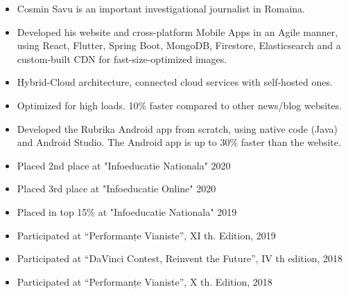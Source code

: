 \documentclass[10pt,a4paper,ragged2e]{resume}
\begin{document}

    \begin{fullwidth}
        \makecvheader
    \end{fullwidth}





    \begin{itemize}
        \item Cosmin Savu is an important investigational journalist in Romaina.
        \item Developed his website and cross-platform Mobile Apps in an Agile manner, using React, Flutter, Spring Boot, MongoDB, Firestore, Elasticsearch and a custom-built CDN for fast-size-optimized images.
        \item Hybrid-Cloud architecture, connected cloud services with self-hosted ones.
        \item Optimized for high loads. 10\% faster compared to other news/blog websites.
    \end{itemize}

    \divider

    \begin{itemize}
        \item Developed the Rubrika Android app from scratch, using native code (Java) and Android Studio. The Android app is up to 30\% faster than the website.
        \smallskip
    \end{itemize}

    \smallskip
    \begin{itemize}
        \item Placed 2nd place at "Infoeducatie Nationala" 2020
        \item Placed 3rd place at "Infoeducatie Online" 2020
        \item Placed in top 15\% at "Infoeducatie Nationala" 2019
        \item Participated at \textquotedblleft Performanțe Vianiste\textquotedblright, XI th. Edition, 2019
        \item Participated at \textquotedblleft DaVinci Contest, Reinvent the Future\textquotedblright, IV th edition, 2018
        \item Participated at \textquotedblleft Performanțe Vianiste\textquotedblright, X th. Edition, 2018
    \end{itemize}
\end{document}

